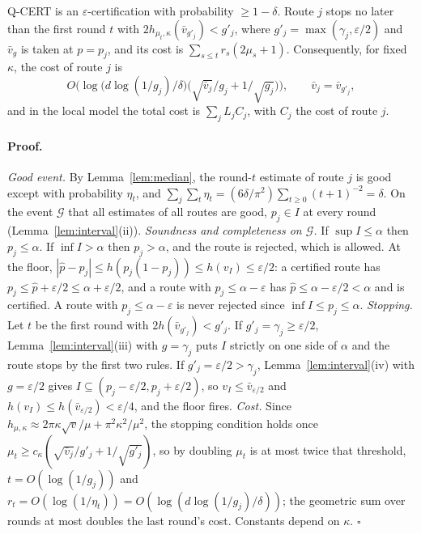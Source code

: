 \begin{theorem}[Q-CERT]\label{thm:qcert}
Q-CERT is an $\varepsilon$-certification with probability $\ge1-\delta$. Route $j$ stops no later than the first round $t$ with $2h_{\mu_t,\kappa}(\bar v_{g'_j})<g'_j$, where $g'_j=\max(\gamma_j,\varepsilon/2)$ and $\bar v_{g}$ is taken at $p=p_j$, and its cost is $\sum_{s\le t}r_s(2\mu_s+1)$. Consequently, for fixed $\kappa$, the cost of route $j$ is
\[
O\Big(\log\big(d\log(1/g_j)/\delta\big)\Big(\sqrt{\bar v_j}/g_j+1/\sqrt{g_j}\Big)\Big),\qquad \bar v_j=\bar v_{g'_j},
\]
and in the local model the total cost is $\sum_jL_jC_j$, with $C_j$ the cost of route $j$.
\end{theorem}
\paragraph{Proof.} \emph{Good event.} By Lemma~\ref{lem:median}, the round-$t$ estimate of route $j$ is good except with probability $\eta_t$, and $\sum_j\sum_t\eta_t=(6\delta/\pi^2)\sum_{t\ge0}(t+1)^{-2}=\delta$. On the event $\mathcal G$ that all estimates of all routes are good, $p_j\in I$ at every round (Lemma~\ref{lem:interval}(ii)).
\emph{Soundness and completeness on $\mathcal G$.} If $\sup I\le\alpha$ then $p_j\le\alpha$. If $\inf I>\alpha$ then $p_j>\alpha$, and the route is rejected, which is allowed. At the floor, $|\hat p-p_j|\le h(p_j(1-p_j))\le h(v_I)\le\varepsilon/2$: a certified route has $p_j\le\hat p+\varepsilon/2\le\alpha+\varepsilon/2$, and a route with $p_j\le\alpha-\varepsilon$ has $\hat p\le\alpha-\varepsilon/2<\alpha$ and is certified. A route with $p_j\le\alpha-\varepsilon$ is never rejected since $\inf I\le p_j\le\alpha$.
\emph{Stopping.} Let $t$ be the first round with $2h(\bar v_{g'_j})<g'_j$. If $g'_j=\gamma_j\ge\varepsilon/2$, Lemma~\ref{lem:interval}(iii) with $g=\gamma_j$ puts $I$ strictly on one side of $\alpha$ and the route stops by the first two rules. If $g'_j=\varepsilon/2>\gamma_j$, Lemma~\ref{lem:interval}(iv) with $g=\varepsilon/2$ gives $I\subseteq(p_j-\varepsilon/2,p_j+\varepsilon/2)$, so $v_I\le\bar v_{\varepsilon/2}$ and $h(v_I)\le h(\bar v_{\varepsilon/2})<\varepsilon/4$, and the floor fires.
\emph{Cost.} Since $h_{\mu,\kappa}\approx2\pi\kappa\sqrt v/\mu+\pi^2\kappa^2/\mu^2$, the stopping condition holds once $\mu_t\ge c_\kappa(\sqrt{\bar v_j}/g'_j+1/\sqrt{g'_j})$, so by doubling $\mu_t$ is at most twice that threshold, $t=O(\log(1/g_j))$ and $r_t=O(\log(1/\eta_t))=O(\log(d\log(1/g_j)/\delta))$; the geometric sum over rounds at most doubles the last round's cost. Constants depend on $\kappa$. \hfill$\square$

